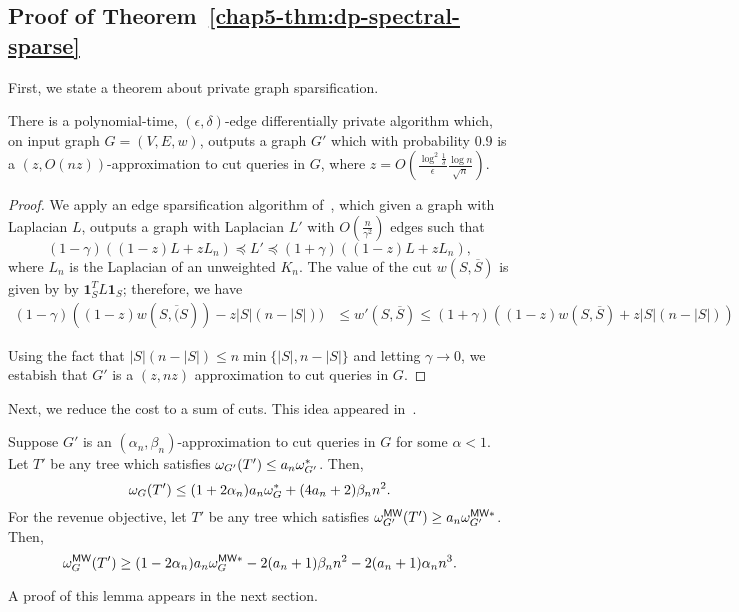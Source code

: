 \subsection{Proof of Theorem~\ref{chap5-thm:dp-spectral-sparse}}
First, we state a theorem about private graph sparsification.
\begin{thm}\label{chap5-thm:dp-spectral-sparse}
    There is a polynomial-time, $(\epsilon, \delta)$-edge differentially private algorithm which, on input graph $G = (V, E, w)$, outputs a graph $G'$ which with probability $0.9$ is a $(z, O(nz))$-approximation to cut queries in $G$, where $z = O(\frac{\log^2 \frac{1}{\delta}}{\epsilon}\frac{\log n}{\sqrt{n}})$.
\end{thm}
\begin{proof}
We apply an edge sparsification algorithm of~\citet{arora2019differentially}, which given a graph with Laplacian $L$, outputs a graph with Laplacian $L'$ with $O(\frac{n}{\gamma^2})$ edges such that
\[
    (1-\gamma) ((1-z)L + z L_n) \preceq L' \preceq (1+\gamma) ((1-z)L + z L_n),
\]
where $L_n$ is the Laplacian of an unweighted $K_n$. The value of the cut $w(S, \overline{S})$ is given by by $\textbf{1}_S^T L \textbf{1}_S$; therefore, we have
\begin{align*}
    (1-\gamma) ((1-z) w(S, \overline(S)) - z |S|(n-|S|)) &\leq w'(S, \overline{S}) \leq (1+\gamma) ((1-z) w(S, \overline{S}) + z |S|(n-|S|))
\end{align*}

Using the fact that $|S|(n-|S|) \leq n \min \{|S|, n-|S|\}$ and letting $\gamma \rightarrow 0$, we estabish that $G'$ is a $(z, n z)$ approximation to cut queries in $G$.
\end{proof}
Next, we reduce the cost to a sum of cuts. This idea appeared in~\citet{agarwal2022sublinear}. 
\begin{lem}\label{chap5-lem:hc-cuts}
    Suppose $G'$ is an $(\alpha_n, \beta_n)$-approximation to cut queries in $G$ for some $\alpha < 1$. Let $T'$ be any tree which satisfies $\omega_{G'}(T') \leq a_n \omega_{G'}^*$. Then,
    \[
        \omega_G(T') \leq (1+2\alpha_n) a_n \omega_G^* + (4a_n + 2) \beta_n n^2.
    \]
    For the revenue objective, let $T'$ be any tree which satisfies $\omega_{G'}^{\textsf{MW}}(T') \geq a_n \omega_{G'}^{\textsf{MW}*}$. Then,
    \[
        \omega_G^{\textsf{MW}}(T') \geq (1-2\alpha_n) a_n \omega_{G}^{\textsf{MW}*} - 2(a_n+1)\beta_n n^2 - 2(a_n+1)\alpha_n n^3.
    \]
\end{lem}
A proof of this lemma appears in the next section.

